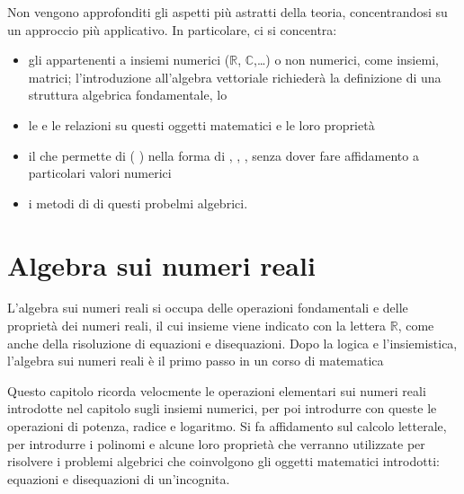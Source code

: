 \documentclass[letterpaper,10pt,italian]{jupyterBook}
\begin{document}
\sphinxAtStartPar
Non vengono approfonditi gli aspetti più astratti della teoria, concentrandosi su un approccio più applicativo. In particolare, ci si concentra:
\begin{itemize}
\item {} 
\sphinxAtStartPar
gli  appartenenti a insiemi numerici (\(\mathbb{R}\), \(\mathbb{C}\),…) o non numerici, come insiemi, matrici; l’introduzione all’algebra vettoriale richiederà la definizione di una struttura algebrica fondamentale, lo 

\item {} 
\sphinxAtStartPar
le  e le relazioni su questi oggetti matematici e le loro proprietà

\item {} 
\sphinxAtStartPar
il  che permette di  ( ) nella forma di , , , senza dover fare affidamento a particolari valori numerici

\item {} 
\sphinxAtStartPar
i metodi di  di questi probelmi algebrici.

\end{itemize}

\sphinxstepscope




\chapter{Algebra sui numeri reali}
\label{\detokenize{ch/algebra/real-algebra:algebra-sui-numeri-reali}}\label{\detokenize{ch/algebra/real-algebra:math-hs-algebra-real}}\label{\detokenize{ch/algebra/real-algebra::doc}}
\sphinxAtStartPar
L’algebra sui numeri reali si occupa delle operazioni fondamentali e delle proprietà dei numeri reali, il cui insieme viene indicato con la lettera \(\mathbb{R}\), come anche della risoluzione di equazioni e disequazioni. Dopo la logica e l’insiemistica, l’algebra sui numeri reali è il primo passo in un corso di matematica  

\sphinxAtStartPar
Questo capitolo ricorda velocmente le operazioni elementari sui numeri reali introdotte nel capitolo sugli insiemi numerici, per poi introdurre con queste le operazioni di potenza, radice e logaritmo. Si fa affidamento sul calcolo letterale, per introdurre i polinomi e alcune loro proprietà che verranno utilizzate per risolvere i problemi algebrici che coinvolgono gli oggetti matematici introdotti: equazioni e disequazioni di un’incognita.
\end{document}
